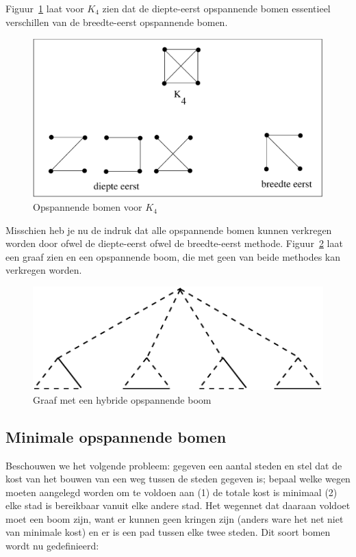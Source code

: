 Figuur~\ref{opspannend2} laat voor $K_{4}$ zien dat de diepte-eerst
opspannende bomen essentieel verschillen van de breedte-eerst
opspannende bomen.

\begin{figure}[ht]
\begin{center}
\includegraphics[width=0.5\linewidth,keepaspectratio]{opspannend2}
\end{center}
\caption{Opspannende bomen voor $K_{4}$\label{opspannend2}}
\end{figure}

Misschien heb je nu de indruk dat alle opspannende bomen kunnen
verkregen worden door ofwel de diepte-eerst ofwel de breedte-eerst
methode. Figuur~\ref{opspannend5} laat een graaf zien en een
opspannende boom, die met geen van beide methodes kan verkregen
worden.

\begin{figure}[ht]
\begin{center}
\includegraphics[width=0.5\linewidth,keepaspectratio]{opspannend5}
\end{center}
\caption{Graaf met een hybride opspannende boom\label{opspannend5}}
\end{figure}


\subsection{Minimale opspannende bomen}

Beschouwen we het volgende probleem: gegeven een aantal steden en stel
dat de kost van het bouwen van een weg tussen de steden gegeven is;
bepaal welke wegen moeten aangelegd worden om te voldoen aan (1) de
totale kost is minimaal (2) elke stad is bereikbaar vanuit elke andere
stad. Het wegennet dat daaraan voldoet moet een boom zijn, want er
kunnen geen kringen zijn (anders ware het net niet van minimale kost)
en er is een pad tussen elke twee steden. Dit soort bomen wordt
nu gedefinieerd:


